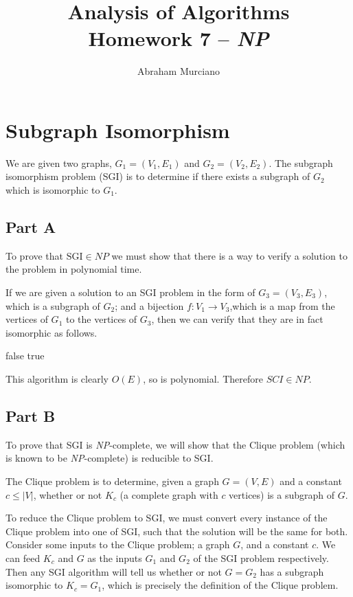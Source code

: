 \documentclass{article}
\title{Analysis of Algorithms \\
\medskip
\large Homework 7 -- \textit{NP}}
\author{Abraham Murciano}
\begin{document}
\maketitle

\section{Subgraph Isomorphism}

We are given two graphs, \(G_1 = (V_1, E_1)\) and \(G_2 = (V_2, E_2)\). The subgraph isomorphism problem (SGI) is to determine if there exists a subgraph of \(G_2\) which is isomorphic to \(G_1\).

\subsection*{Part A}

To prove that \(\text{SGI} \in \mathit{NP}\) we must show that there is a way to verify a solution to the problem in polynomial time.

If we are given a solution to an SGI problem in the form of \(G_3 = (V_3, E_3)\), which is a subgraph of \(G_2\); and a bijection \(f : V_1 \to V_3\),which is a map from the vertices of \(G_1\) to the vertices of \(G_3\), then we can verify that they are in fact isomorphic as follows.

\begin{algorithm}
	\begin{algorithmic}
		\Return false
		\EndIf
		\EndFor
		\State \Return true
		\EndFunction
	\end{algorithmic}
\end{algorithm}

This algorithm is clearly \(O(E)\), so is polynomial. Therefore \(\mathit{SCI} \in \mathit{NP}\).

\subsection*{Part B}

To prove that SGI is \textit{NP}-complete, we will show that the Clique problem (which is known to be \textit{NP}-complete) is reducible to SGI.

The Clique problem is to determine, given a graph \(G = (V, E)\) and a constant \(c \leq |V|\), whether or not \(K_c\) (a complete graph with \(c\) vertices) is a subgraph of \(G\).

To reduce the Clique problem to SGI, we must convert every instance of the Clique problem into one of SGI, such that the solution will be the same for both. Consider some inputs to the Clique problem; a graph \(G\), and a constant \(c\). We can feed \(K_c\) and \(G\) as the inputs \(G_1\) and \(G_2\) of the SGI problem respectively. Then any SGI algorithm will tell us whether or not \(G = G_2\) has a subgraph isomorphic to \(K_c = G_1\), which is precisely the definition of the Clique problem.
\end{document}
